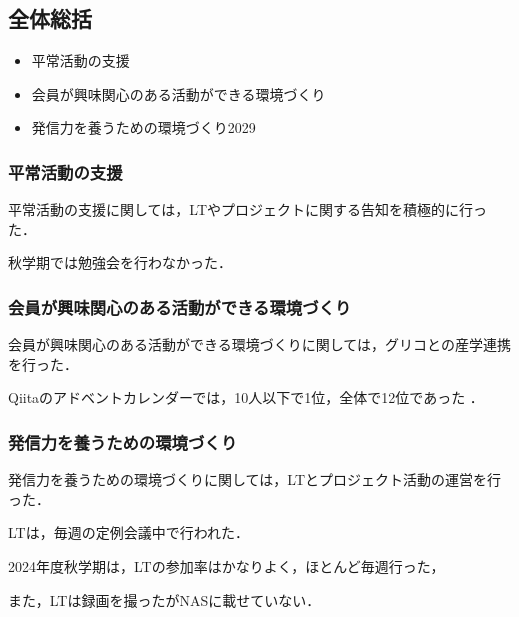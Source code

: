\subsection*{全体総括}


\begin{itemize}
    \item 平常活動の支援
    \item 会員が興味関心のある活動ができる環境づくり
    \item 発信力を養うための環境づくり2029
\end{itemize}

\subsubsection*{平常活動の支援}
平常活動の支援に関しては，LTやプロジェクトに関する告知を積極的に行った．

秋学期では勉強会を行わなかった．　

\subsubsection*{会員が興味関心のある活動ができる環境づくり}
会員が興味関心のある活動ができる環境づくりに関しては，グリコとの産学連携を行った．

Qiitaのアドベントカレンダーでは，10人以下で1位，全体で12位であった  ．


\subsubsection*{発信力を養うための環境づくり}
発信力を養うための環境づくりに関しては，LTとプロジェクト活動の運営を行った．

LTは，毎週の定例会議中で行われた．

2024年度秋学期は，LTの参加率はかなりよく，ほとんど毎週行った，

また，LTは録画を撮ったがNASに載せていない．

